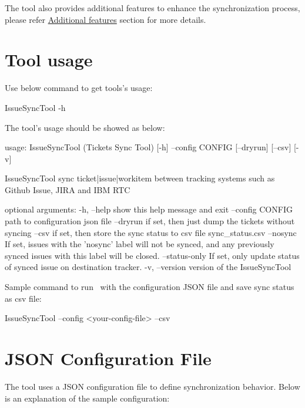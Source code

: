The tool also provides additional features to enhance the synchronization process,
please refer \hyperlink{additional-features}{Additional features} section for more details.

\hypertarget{tool-usage}{%
\section{Tool usage}\label{tool-usage}}

Use below command to get tools's usage:

\begin{pythonlog}
IssueSyncTool -h
\end{pythonlog}

The tool's usage should be showed as below:

\begin{pythonlog}
usage: IssueSyncTool (Tickets Sync Tool) [-h] --config CONFIG [--dryrun] [--csv] [-v]

IssueSyncTool sync ticket|issue|workitem between tracking systems such as Github Issue, JIRA and IBM RTC

optional arguments:
  -h, --help       show this help message and exit
  --config CONFIG  path to configuration json file
  --dryrun         if set, then just dump the tickets without syncing
  --csv            if set, then store the sync status to csv file sync_status.csv
  --nosync         If set, issues with the 'nosync' label will not be synced,
                   and any previously synced issues with this label will be closed.
  --status-only    If set, only update status of synced issue on destination tracker.
  -v, --version    version of the IssueSyncTool
\end{pythonlog}

Sample command to run \pkg\ with the configuration JSON file and save sync
status as csv file:

\begin{pythonlog}
IssueSyncTool --config <your-config-file> --csv
\end{pythonlog}

\hypertarget{config-file}{%
\section{JSON Configuration File}\label{config-file}}

The tool uses a JSON configuration file to define synchronization behavior.
Below is an explanation of the sample configuration:

